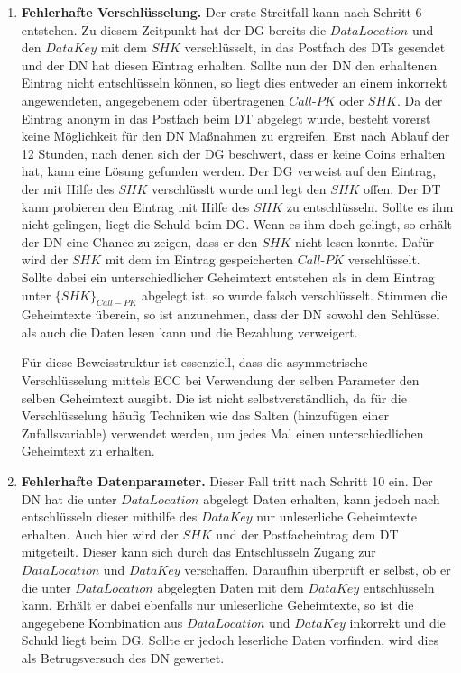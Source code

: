 \documentclass[
	fontsize=11pt,
	headings=small,
	parskip=half,           %
	bibliography=totoc,
	numbers=noenddot,       %
	open=any,               %
]{scrreprt}
\begin{document}
\begin{enumerate}
    \item \textbf{Fehlerhafte Verschlüsselung.}\label{case:IncorrectEncryption}
    Der erste Streitfall kann nach Schritt 6 entstehen. Zu diesem Zeitpunkt hat der DG bereits die $DataLocation$ und den $DataKey$ mit dem $SHK$ verschlüsselt, in das Postfach des DTs gesendet und der DN hat diesen Eintrag erhalten. Sollte nun der DN den erhaltenen Eintrag nicht entschlüsseln können, so liegt dies entweder an einem inkorrekt angewendeten, angegebenem oder übertragenen $Call$-$PK$ oder $SHK$. Da der Eintrag anonym in das Postfach beim DT abgelegt wurde, besteht vorerst keine Möglichkeit für den DN Maßnahmen zu ergreifen. Erst nach Ablauf der 12 Stunden, nach denen sich der DG beschwert, dass er keine Coins erhalten hat, kann eine Lösung gefunden werden. Der DG verweist auf den Eintrag, der mit Hilfe des $SHK$ verschlüsslt wurde und legt den $SHK$ offen. Der DT kann probieren den Eintrag mit Hilfe des $SHK$ zu entschlüsseln. Sollte es ihm nicht gelingen, liegt die Schuld beim DG. Wenn es ihm doch gelingt, so erhält der DN eine Chance zu zeigen, dass er den $SHK$ nicht lesen konnte. Dafür wird der $SHK$ mit dem im Eintrag gespeicherten $Call$-$PK$ verschlüsselt. Sollte dabei ein unterschiedlicher Geheimtext entstehen als in dem Eintrag unter $\{SHK\}_{Call-PK}$ abgelegt ist, so wurde falsch verschlüsselt. Stimmen die Geheimtexte überein, so ist anzunehmen, dass der DN sowohl den Schlüssel als auch die Daten lesen kann und die Bezahlung verweigert. 

    Für diese Beweisstruktur ist essenziell, dass die asymmetrische Verschlüsselung mittels ECC bei Verwendung der selben Parameter den selben Geheimtext ausgibt. Die ist nicht selbstverständlich, da für die Verschlüsselung häufig Techniken wie das Salten (hinzufügen einer Zufallsvariable) verwendet werden, um jedes Mal einen unterschiedlichen Geheimtext zu erhalten.
    
    
    \item \textbf{Fehlerhafte Datenparameter.}\label{case:IncorrectDataParameters}
    Dieser Fall tritt nach Schritt 10 ein. Der DN hat die unter $DataLocation$ abgelegt Daten erhalten, kann jedoch nach entschlüsseln dieser mithilfe des $DataKey$ nur unleserliche Geheimtexte erhalten. Auch hier wird der $SHK$ und der Postfacheintrag dem DT mitgeteilt. Dieser kann sich durch das Entschlüsseln Zugang zur $DataLocation$ und $DataKey$ verschaffen. Daraufhin überprüft er selbst, ob er die unter $DataLocation$ abgelegten Daten mit dem $DataKey$ entschlüsseln kann. Erhält er dabei ebenfalls nur unleserliche Geheimtexte, so ist die angegebene Kombination aus $DataLocation$ und $DataKey$ inkorrekt und die Schuld liegt beim DG. Sollte er jedoch leserliche Daten vorfinden, wird dies als Betrugsversuch des DN gewertet.


\end{enumerate}
\end{document}
